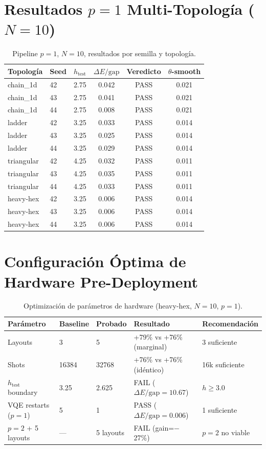 \documentclass[11pt,a4paper,spanish]{book}
\begin{document}
\section{Resultados $p = 1$ Multi-Topología ($N = 10$)}

\begin{table}[h]
\centering
\caption{Pipeline $p = 1$, $N = 10$, resultados por semilla y topología.}
\label{tab:app_p1_detail}
\begin{tabular}{llcccc}
\toprule
\textbf{Topología} & \textbf{Seed} & \textbf{$h_{\text{test}}$} & \textbf{$\Delta E/\text{gap}$} & \textbf{Veredicto} & \textbf{$\theta$-smooth} \\
\midrule
chain\_1d & 42 & 2.75 & 0.042 & PASS & 0.021 \\
chain\_1d & 43 & 2.75 & 0.041 & PASS & 0.021 \\
chain\_1d & 44 & 2.75 & 0.008 & PASS & 0.021 \\
ladder & 42 & 3.25 & 0.033 & PASS & 0.014 \\
ladder & 43 & 3.25 & 0.025 & PASS & 0.014 \\
ladder & 44 & 3.25 & 0.029 & PASS & 0.014 \\
triangular & 42 & 4.25 & 0.032 & PASS & 0.011 \\
triangular & 43 & 4.25 & 0.035 & PASS & 0.011 \\
triangular & 44 & 4.25 & 0.033 & PASS & 0.011 \\
heavy-hex & 42 & 3.25 & 0.006 & PASS & 0.014 \\
heavy-hex & 43 & 3.25 & 0.006 & PASS & 0.014 \\
heavy-hex & 44 & 3.25 & 0.006 & PASS & 0.014 \\
\bottomrule
\end{tabular}
\end{table}

\section{Configuración Óptima de Hardware Pre-Deployment}

\begin{table}[h]
\centering
\caption{Optimización de parámetros de hardware (heavy-hex, $N = 10$, $p = 1$).}
\label{tab:app_hw_params}
\begin{tabular}{lllll}
\toprule
\textbf{Parámetro} & \textbf{Baseline} & \textbf{Probado} & \textbf{Resultado} & \textbf{Recomendación} \\
\midrule
Layouts & 3 & 5 & +79\% vs +76\% (marginal) & 3 suficiente \\
Shots & 16384 & 32768 & +76\% vs +76\% (idéntico) & 16k suficiente \\
$h_{\text{test}}$ boundary & 3.25 & 2.625 & FAIL ($\Delta E/\text{gap} = 10.67$) & $h \geq 3.0$ \\
VQE restarts ($p=1$) & 5 & 1 & PASS ($\Delta E/\text{gap} = 0.006$) & 1 suficiente \\
$p=2$ + 5 layouts & — & 5 layouts & FAIL (gain=$-$27\%) & $p=2$ no viable \\
\bottomrule
\end{tabular}
\end{table}
\end{document}
